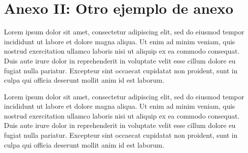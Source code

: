 \documentclass[12pt,a4paper]{report}
\begin{document}
\chapter{Anexo II: Otro ejemplo de anexo}\label{cap:anexo2}
Lorem ipsum dolor sit amet, consectetur adipiscing elit, sed do eiusmod tempor incididunt ut labore et dolore magna aliqua. Ut enim ad minim veniam, quis nostrud exercitation ullamco laboris nisi ut aliquip ex ea commodo consequat. Duis aute irure dolor in reprehenderit in voluptate velit esse cillum dolore eu fugiat nulla pariatur. Excepteur sint occaecat cupidatat non proident, sunt in culpa qui officia deserunt mollit anim id est laborum.

Lorem ipsum dolor sit amet, consectetur adipiscing elit, sed do eiusmod tempor incididunt ut labore et dolore magna aliqua. Ut enim ad minim veniam, quis nostrud exercitation ullamco laboris nisi ut aliquip ex ea commodo consequat. Duis aute irure dolor in reprehenderit in voluptate velit esse cillum dolore eu fugiat nulla pariatur. Excepteur sint occaecat cupidatat non proident, sunt in culpa qui officia deserunt mollit anim id est laborum.


%

\end{document}
